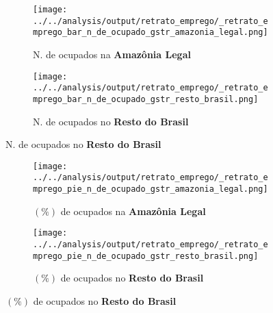 \documentclass[11pt]{beamer}
\begin{document}
\begin{frame}[label=_retrato_emprego_bar_n_de_ocupado_gstr]{}
\textit{\hyperlink{indice_principal}{}}
\begin{figure}
\centering
\begin{subfigure}{.5\textwidth}
  \centering
  \texttt{[image: ../../analysis/output/retrato\_emprego/\_retrato\_emprego\_bar\_n\_de\_ocupado\_gstr\_amazonia\_legal.png]}
  \label{fig:_retrato_emprego_bar_n_de_ocupado_gstr_amazonia_legal}
  \caption{{\tiny N. de ocupados na \textbf{Amazônia Legal}}}
\end{subfigure}%
\begin{subfigure}{.5\textwidth}
  \centering
  \texttt{[image: ../../analysis/output/retrato\_emprego/\_retrato\_emprego\_bar\_n\_de\_ocupado\_gstr\_resto\_brasil.png]}
  \label{fig:_retrato_emprego_bar_n_de_ocupado_gstr_resto_brasil}
   \caption{{\tiny N. de ocupados no \textbf{Resto do Brasil}}}
\end{subfigure}
\end{figure}
\end{frame}

\begin{frame}[label=_retrato_emprego_pie_n_de_ocupado_gstr]{}
\textit{\hyperlink{indice_principal}{}}
\begin{figure}
\centering
\begin{subfigure}{.5\textwidth}
  \centering
  \texttt{[image: ../../analysis/output/retrato\_emprego/\_retrato\_emprego\_pie\_n\_de\_ocupado\_gstr\_amazonia\_legal.png]}
  \label{fig:_retrato_emprego_pie_n_de_ocupado_gstr_amazonia_legal}
  \caption{{\tiny $(\%)$ de ocupados na \textbf{Amazônia Legal}}}
\end{subfigure}%
\begin{subfigure}{.5\textwidth}
  \centering
  \texttt{[image: ../../analysis/output/retrato\_emprego/\_retrato\_emprego\_pie\_n\_de\_ocupado\_gstr\_resto\_brasil.png]}
  \label{fig:_retrato_emprego_pie_n_de_ocupado_gstr_resto_brasil}
   \caption{{\tiny $(\%)$ de ocupados no \textbf{Resto do Brasil}}}
\end{subfigure}
\end{figure}
\end{frame}
\end{document}
